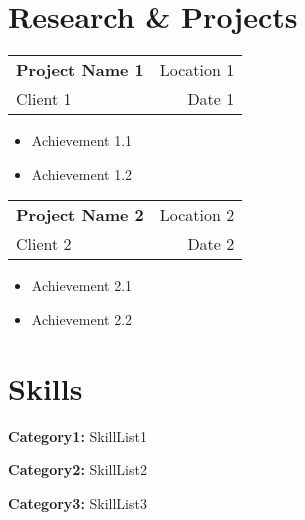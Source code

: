 \documentclass{article}
\newcommand{\projectitem}[4]{%
    \item
    \begin{tabularx}{\linewidth}{X r}
        \textbf{#1} & #2 \\
        #3 & #4
    \end{tabularx}
}
\newcommand{\skillcategory}[2]{%
    \item \textbf{#1:} #2
}
\begin{document}
\section{Research \& Projects}
\begin{projectlist}
    \projectitem{Project Name 1}{Location 1}{Client 1}{Date 1}
    \begin{itemize}
        \item Achievement 1.1
        \item Achievement 1.2
    \end{itemize}
    
    \projectitem{Project Name 2}{Location 2}{Client 2}{Date 2}
    \begin{itemize}
        \item Achievement 2.1
        \item Achievement 2.2
    \end{itemize}
\end{projectlist}

\section{Skills}
\begin{skilllist}
    \skillcategory{Category1}{SkillList1}
    \skillcategory{Category2}{SkillList2}
    \skillcategory{Category3}{SkillList3}
\end{skilllist}
\end{document}
